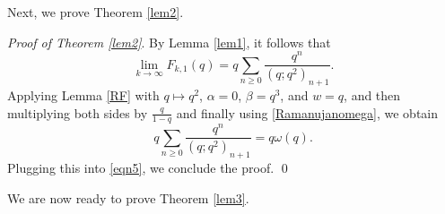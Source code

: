 \documentclass[12pt,reqno]{amsart}
\renewcommand{\b}{\beta}
\renewcommand{\(}{\left\(}
\renewcommand{\)}{\right\)}
\numberwithin{equation}{section}
\theoremstyle{plain}
\theoremstyle{definition}
\numberwithin{equation}{section}
\begin{document}
Next, we prove Theorem \ref{lem2}. 

\noindent \emph{Proof of Theorem \ref{lem2}}.  By Lemma \ref{lem1}, it follows that
\begin{equation}\label{eqn5}
\lim_{k\to\infty} F_{k,1}(q)= q \sum_{n\ge 0}\frac{q^{n}}{\left(q;q^2\right)_{n+1}}.
\end{equation}
Applying Lemma \ref{RF} with $q\mapsto q^2$, $\alpha=0$, $\b=q^3$, and $w=q$, and then multiplying both sides by $\frac{q}{1-q}$ and finally using \eqref{Ramanujanomega}, we obtain
\begin{equation}\label{Omegareps}
q\sum_{n\ge 0}\frac{q^n}{\left(q;q^2\right)_{n+1}}
=q\omega(q).
\end{equation}
Plugging this into \eqref{eqn5}, we conclude the proof. \qed 



We are now ready to prove Theorem \ref{lem3}.
\end{document}
